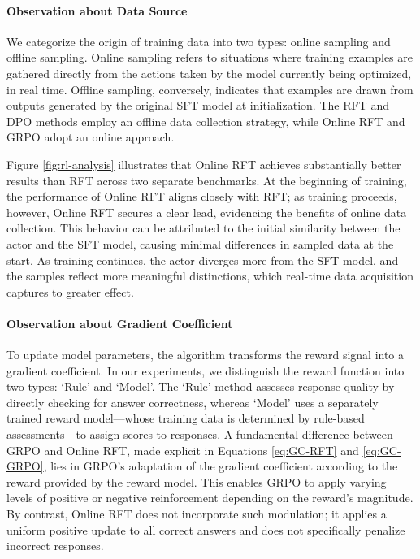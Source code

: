 \paragraph{Observation about Data Source} We categorize the origin of training data into two types: online sampling and offline sampling. Online sampling refers to situations where training examples are gathered directly from the actions taken by the model currently being optimized, in real time. Offline sampling, conversely, indicates that examples are drawn from outputs generated by the original SFT model at initialization. The RFT and DPO methods employ an offline data collection strategy, while Online RFT and GRPO adopt an online approach.

Figure \ref{fig:rl-analysis} illustrates that Online RFT achieves substantially better results than RFT across two separate benchmarks. At the beginning of training, the performance of Online RFT aligns closely with RFT; as training proceeds, however, Online RFT secures a clear lead, evidencing the benefits of online data collection. This behavior can be attributed to the initial similarity between the actor and the SFT model, causing minimal differences in sampled data at the start. As training continues, the actor diverges more from the SFT model, and the samples reflect more meaningful distinctions, which real-time data acquisition captures to greater effect.

\paragraph{Observation about Gradient Coefficient} To update model parameters, the algorithm transforms the reward signal into a gradient coefficient. In our experiments, we distinguish the reward function into two types: ‘Rule’ and ‘Model’. The ‘Rule’ method assesses response quality by directly checking for answer correctness, whereas ‘Model’ uses a separately trained reward model—whose training data is determined by rule-based assessments—to assign scores to responses. A fundamental difference between GRPO and Online RFT, made explicit in Equations \ref{eq:GC-RFT} and \ref{eq:GC-GRPO}, lies in GRPO’s adaptation of the gradient coefficient according to the reward provided by the reward model. This enables GRPO to apply varying levels of positive or negative reinforcement depending on the reward's magnitude. By contrast, Online RFT does not incorporate such modulation; it applies a uniform positive update to all correct answers and does not specifically penalize incorrect responses.

